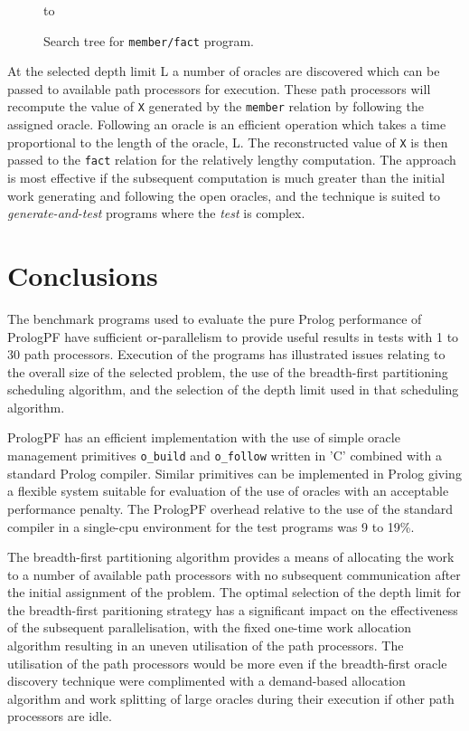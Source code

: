 \begin{figure}[htbp]
\vspace{5mm} \hbox to 
\caption{Search tree for \texttt{member/fact} program.}
\vspace{5mm}
\label{stream_and}
\end{figure}

At the selected depth limit L a number of oracles are discovered which can be passed
to available path processors for execution.  These path processors will recompute the
value of \texttt{X} generated by the \texttt{member} relation by following the
assigned oracle.  Following an oracle is an efficient operation which takes a time
proportional to the length of the oracle, L.  The reconstructed value of \texttt{X}
is then passed to the \texttt{fact} relation for the relatively lengthy computation.
The approach is most effective if the subsequent computation is much greater than
the initial work generating and following the open oracles, and the technique is
suited to \textit{generate-and-test} programs where the \textit{test} is complex.

\section{Conclusions} %

The benchmark programs used to evaluate the pure Prolog performance of PrologPF
have sufficient or-parallelism to provide useful results in tests with 1 to
30 path processors.  Execution of the programs has illustrated issues relating to
the overall size of the selected problem, the use of the breadth-first partitioning
scheduling algorithm, and the selection of the depth limit used in that
scheduling algorithm.

PrologPF has an efficient implementation with the use of simple oracle
management primitives \texttt{o\_{}build} and \texttt{o\_{}follow} 
written in 'C' combined with a standard Prolog compiler.  Similar
primitives can be implemented in Prolog giving a flexible system
suitable for evaluation of the use of oracles with an acceptable
performance penalty.  The PrologPF overhead relative to the use of the standard compiler
in a single-cpu environment for the test programs was 9 to 19\%.

The breadth-first partitioning algorithm provides a means of allocating the work
to a number of available path processors with no subsequent communication after
the initial assignment of the problem.  The optimal selection of the depth limit
for the breadth-first paritioning strategy has a significant impact on the
effectiveness of the subsequent parallelisation, with the fixed one-time work
allocation algorithm resulting in an uneven utilisation of the path processors.
The utilisation of the path processors would be more even if the breadth-first
oracle discovery technique were complimented with a demand-based allocation
algorithm and work splitting of large oracles during their execution if other path
processors are idle.


